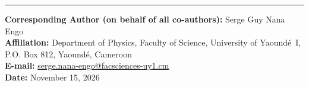 \documentclass[11pt,a4paper]{article}
\begin{document}
\vspace{1.2em}
\noindent\rule{\textwidth}{0.4pt}

\vspace{0.8em}
\noindent
\textbf{Corresponding Author (on behalf of all co-authors):} Serge Guy Nana Engo\\
\textbf{Affiliation:} Department of Physics, Faculty of Science, University of Yaound\'e~I, P.O. Box 812, Yaound\'e, Cameroon\\
\textbf{E-mail:} \href{mailto:serge.nana-engo@facsciences-uy1.cm}{serge.nana-engo@facsciences-uy1.cm}\\
\textbf{Date:} November 15, 2026
\end{document}
